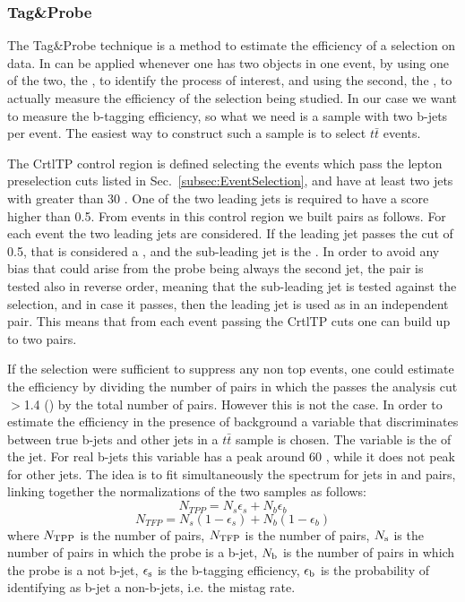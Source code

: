 \subsubsection{Tag\&Probe \label{sec:TagAndProbe}}
The Tag\&Probe technique is a method to estimate the efficiency of a selection on data. In can be applied whenever one has two objects in one event, by using one of the two, the \tg{}, to identify the process of interest, and using the second, the \probe{}, to actually measure the efficiency of the selection being studied. In our case we want to measure the b-tagging efficiency, so what we need is a sample with two b-jets per event. The easiest way to construct such a sample is to select $t\bar{t}$ events.

The CrtlTP control region is defined selecting the events which pass the lepton preselection cuts listed in Sec.~\ref{subsec:EventSelection}, and have at least two jets with \pt greater than 30 \GeV.
One of the two leading jets is required to have a \jpb score higher than 0.5. From events in this control region we built \tp{} pairs as follows. For each event the two leading jets are considered. If the leading jet passes the \jpb cut of 0.5, that is considered a \tg{}, and the sub-leading jet is the \probe{}. In order to avoid any bias that could arise from the probe being always the second jet, the pair is tested also in reverse order, meaning that the sub-leading jet is tested against the \tg{} selection, and in case it passes, then the leading jet is used as \probe{} in an independent \tp{} pair. This means that from each event passing the CrtlTP cuts one can build up to two \tp{} pairs. 

If the \tg{} selection were sufficient to suppress any non top events, one could estimate the efficiency by dividing the number of \tp{} pairs in which the \probe{} passes the analysis cut \jpb$>$1.4 (\tpp) by the total number of \tp{} pairs. However this is not the case. 
In order to estimate the efficiency in the presence of background a variable that discriminates between true b-jets and other jets in a $t\bar{t}$ sample is chosen. The variable is the \pt of the \probe{} jet. For real b-jets this variable has a peak around 60 \GeV, while it does not peak for other jets. The idea is to fit simultaneously the \pt spectrum for \probe{} jets in \tpp{} and \tfp{} pairs, linking together the normalizations of the two samples as follows:
\begin{equation}
N_{TPP}=N_{s}\epsilon_{s} + N_b\epsilon_{b}
\end{equation}
\begin{equation}
N_{TFP}=N_{s}(1-\epsilon_{s}) + N_b(1-\epsilon_{b})
\end{equation}
where $N_{\rm TPP}$ is the number of \tpp{} pairs, $N_{\rm TFP}$ is the number of \tfp{} pairs, $N_{\rm s}$ is the number of \tp{} pairs in which the probe is a b-jet, $N_{\rm b}$ is the number of \tp{} pairs in which the probe is a not b-jet, $\epsilon_{\rm s}$ is the b-tagging efficiency, $\epsilon_{\rm b}$ is the probability of identifying as b-jet a non-b-jets, i.e. the mistag rate. 

